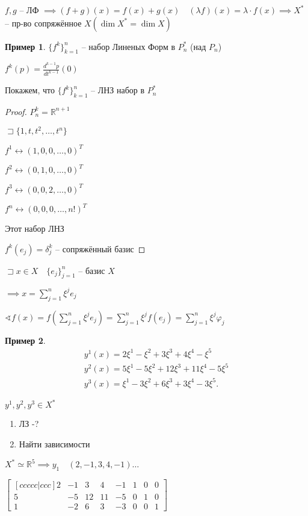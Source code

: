\documentclass{book}
\newcommand\R{\ensuremath{\mathbb{R}}}
\theoremstyle{definition}
\newtheorem*{example}{Пример}
\begin{document}
    $f, g$ -- ЛФ  $\implies  (f+g)(x) = f(x)+g(x)\quad (\lambda f)(x) = \lambda\cdot  f(x) \implies X^*$ -- пр-во сопряжённое $X \left( \dim X^* = \dim X \right) $

    \begin{example}
        $\{f^k\}_{k=1}^n$ -- набор Линеных Форм в  $P_n^*$ (над $P_n$) 

        $f^k(p) = \frac{d^{k-1}p}{dt^{k-1}}(0)$

        Покажем, что $\{f^k\}_{k=1}^n$ -- ЛНЗ набор в  $P_n^*$
    \end{example}
    \begin{proof}
        $P_n^k = \R^{n+1}$

        $\sqsupset \{1, t, t^2, \ldots, t^n\}$

        $f^1 \longleftrightarrow \left( 1, 0, 0, \ldots, 0 \right) ^T$

        $f^2 \longleftrightarrow \left( 0, 1, 0, \ldots, 0 \right) ^T$

        $f^3 \longleftrightarrow \left( 0, 0, 2, \ldots, 0 \right)^T $ 

        $f^n \longleftrightarrow \left( 0, 0, 0, \ldots, n! \right) ^T $

        Этот набор ЛНЗ

        $f^k\left( e_j \right)  = \delta_j^k$ -- сопряжённый базис

    \end{proof}
        $\sqsupset x\in X\quad \{e_j\}_{j=1}^n$ -- базис $X$

        $\implies x = \sum_{j=1}^{n} \xi^je_j$ 

        $\sphericalangle f(x) = f\left( \sum_{j=1}^{n} \xi^je_j \right) = \sum_{j=1}^{n} \xi^jf\left( e_j \right)  = \sum_{j=1}^{n} \xi^j\varphi_j$


        \begin{example}
            \begin{align*}
                y^1(x) = 2\xi^1 - \xi^2 + 3\xi^3 + 4\xi^4 - \xi^5\\
                y^2(x) = 5\xi^1 - 5\xi^2 + 12\xi^3 + 11\xi^4 - 5\xi^5\\
                y^3(x) = \xi^1 - 3\xi^2+6\xi^3+3\xi^4-3\xi^5
            .\end{align*}

            $y^1, y^2, y^3\in X^*$

            \begin{enumerate}
                \item ЛЗ -?
                \item Найти зависимости
            \end{enumerate}

            $X^*\simeq \R^5 \implies y_1\quad (2,-1,3,4,-1)\ldots$

            $\begin{bmatrix} [c c c c c|c c c] 2&-1&3&4&-1&1&0&0\\5&-5&12&11&-5&0&1&0\\1&-2&6&3&-3&0&0&1 \end{bmatrix} $
        \end{example}
\end{document}
